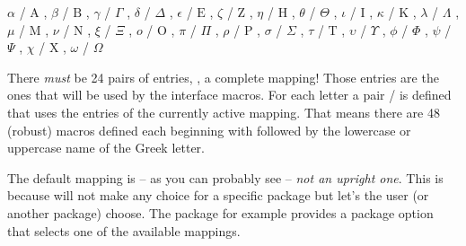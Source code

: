 \documentclass[load-preamble+]{cnltx-doc}
\begin{document}
\begin{sourcecode}
    {
      \ensuremath{\alpha}   / \ensuremath{\mathrm{A}} , %
      \ensuremath{\beta}    / \ensuremath{\mathrm{B}} , %
      \ensuremath{\gamma}   / \ensuremath{\Gamma} ,     %
      \ensuremath{\delta}   / \ensuremath{\Delta} ,     %
      \ensuremath{\epsilon} / \ensuremath{\mathrm{E}} , %
      \ensuremath{\zeta}    / \ensuremath{\mathrm{Z}} , %
      \ensuremath{\eta}     / \ensuremath{\mathrm{H}} , %
      \ensuremath{\theta}   / \ensuremath{\Theta} ,     %
      \ensuremath{\iota}    / \ensuremath{\mathrm{I}} , %
      \ensuremath{\kappa}   / \ensuremath{\mathrm{K}} , %
      \ensuremath{\lambda}  / \ensuremath{\Lambda} ,    %
      \ensuremath{\mu}      / \ensuremath{\mathrm{M}} , %
      \ensuremath{\nu}      / \ensuremath{\mathrm{N}} , %
      \ensuremath{\xi}      / \ensuremath{\Xi} ,        %
      \ensuremath{o}        / \ensuremath{\mathrm{O}} , %
      \ensuremath{\pi}      / \ensuremath{\Pi} ,        %
      \ensuremath{\rho}     / \ensuremath{\mathrm{P}} , %
      \ensuremath{\sigma}   / \ensuremath{\Sigma} ,     %
      \ensuremath{\tau}     / \ensuremath{\mathrm{T}} , %
      \ensuremath{\upsilon} / \ensuremath{\Upsilon} ,   %
      \ensuremath{\phi}     / \ensuremath{\Phi} ,       %
      \ensuremath{\psi}     / \ensuremath{\Psi} ,       %
      \ensuremath{\chi}     / \ensuremath{\mathrm{X}} , %
      \ensuremath{\omega}   / \ensuremath{\Omega}       %
  }
\end{sourcecode}

There \emph{must} be 24 pairs of entries, \ie, a complete mapping!  Those
entries are the ones that will be used by the interface macros.  For each
letter a pair / is defined that uses the entries
of the currently active mapping.  That means there are 48 (robust) macros
defined each beginning with  followed by the lowercase or
uppercase name of the Greek letter.

The default mapping is -- as you can probably see -- \emph{not an upright
  one}.  This is because \chemgreek{} will not make any choice for a specific
package but let's the user (or another package) choose.  The 
package for example provides a package option that selects one of the
available mappings.
\end{document}
